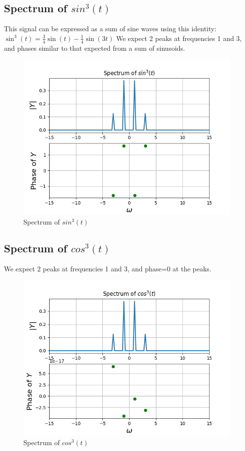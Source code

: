 \documentclass{article}
\begin{document}
\subsection{Spectrum of $sin^3(t)$}
This signal can be expressed as a sum of sine waves using this identity:\newline
$\sin^3(t) = \frac{3}{4}\sin(t) - \frac{1}{4}\sin(3t)$\newline
We expect 2 peaks at frequencies 1 and 3, and phases similar to that expected from a sum of sinusoids.
\begin{figure}[h!]
\centering
\includegraphics[scale=0.5]{fig9-5.png}
\caption{Spectrum of $sin^3(t)$}
\label{fig:universe}
\end{figure}

\subsection{Spectrum of $cos^3(t)$}
We expect 2 peaks at frequencies 1 and 3, and phase=0 at the peaks.
\begin{figure}[h!]
\centering
\includegraphics[scale=0.5]{fig9-6.png}
\caption{Spectrum of $cos^3(t)$}
\label{fig:universe}
\end{figure}
\clearpage
\end{document}
